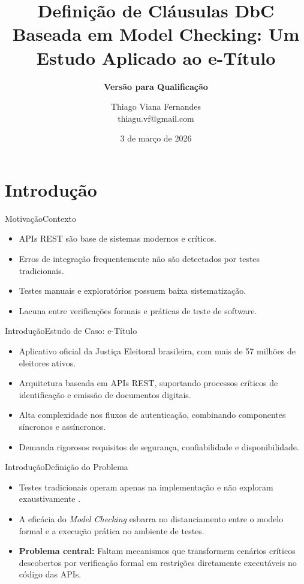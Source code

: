 \documentclass[10pt]{beamer}
\title[]%
{%
  \textbf{Definição de Cláusulas DbC Baseada em Model Checking: Um Estudo Aplicado ao e-Título}
}
\subtitle[Geração Automatizada de Testes Baseada em Model Checking]
{
  \textbf{Versão para Qualificação}
}
\author[Thiago Fernandes]
{Thiago Viana Fernandes \\
  {\ttfamily thiagu.vf@gmail.com}
}
\institute[]
{
  Programa de Pós-Graduação em Computação Aplicada\\
  Universidade de Brasília
}
\date{3 de março de 2026}
\begin{document}
{%
\begin{frame}
  \titlepage
\end{frame}}

\section{Introdução}
\begin{frame}{Motivação}{Contexto}
  \begin{itemize}
    \item APIs REST são base de sistemas modernos e críticos.
    \item Erros de integração frequentemente não são detectados por testes tradicionais.
    \item Testes manuais e exploratórios possuem baixa sistematização.
    \item Lacuna entre verificações formais e práticas de teste de software.
  \end{itemize}
\end{frame}

\begin{frame}{Introdução}{Estudo de Caso: e-Título}
  \begin{itemize}
    \item Aplicativo oficial da Justiça Eleitoral brasileira, com mais de 57 milhões de eleitores ativos.
    \item Arquitetura baseada em APIs REST, suportando processos críticos de identificação e emissão de documentos digitais.
    \item Alta complexidade nos fluxos de autenticação, combinando componentes síncronos e assíncronos.
    \item Demanda rigorosos requisitos de segurança, confiabilidade e disponibilidade.
  \end{itemize}
\end{frame}

\begin{frame}{Introdução}{Definição do Problema}
  \begin{itemize}
    \item Testes tradicionais operam apenas na implementação e não exploram exaustivamente \textbf{}.
    \item A eficácia do \textit{Model Checking} esbarra no distanciamento entre o modelo formal e a execução prática no ambiente de testes.
    \item \textbf{Problema central:} Faltam mecanismos que transformem cenários críticos descobertos por verificação formal em restrições diretamente executáveis no código das APIs.
  \end{itemize}
\end{frame}
\end{document}
